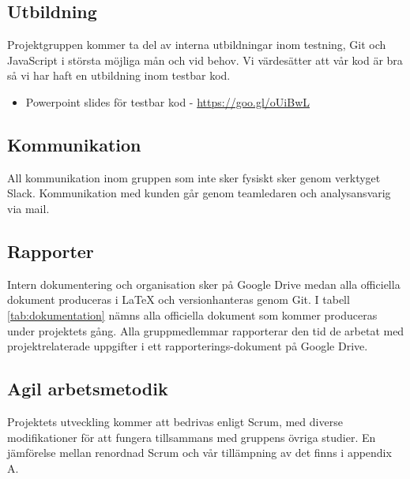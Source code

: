 \subsection{Utbildning}
Projektgruppen kommer ta del av interna utbildningar inom testning, Git och JavaScript i största möjliga mån och vid behov. Vi värdesätter att vår kod är bra så vi har haft en utbildning inom testbar kod.
\begin{itemize}
\item Powerpoint slides för testbar kod - \url{https://goo.gl/oUiBwL}
\end{itemize}

\subsection{Kommunikation}
All kommunikation inom gruppen som inte sker fysiskt sker genom verktyget Slack. Kommunikation med kunden går genom teamledaren och analysansvarig via mail.

\subsection{Rapporter}
Intern dokumentering och organisation sker på Google Drive medan alla officiella dokument produceras i LaTeX och versionhanteras genom Git. I tabell \ref{tab:dokumentation} nämns alla officiella dokument som kommer produceras under projektets gång. Alla gruppmedlemmar rapporterar den tid de arbetat med projektrelaterade uppgifter i ett rapporterings-dokument på Google Drive. 

\subsection{Agil arbetsmetodik}
Projektets utveckling kommer att bedrivas enligt Scrum, med diverse modifikationer för att fungera tillsammans med gruppens övriga studier. En jämförelse mellan renordnad Scrum och vår tillämpning av det finns i appendix A.